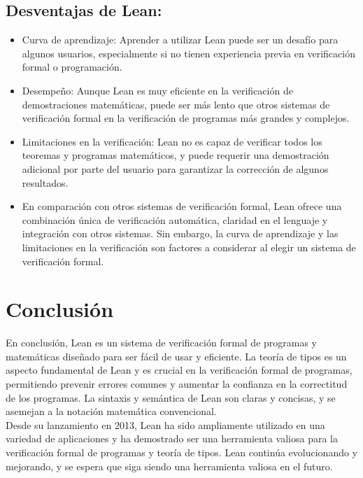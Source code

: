 \documentclass{article}
\begin{document}
\subsection{Desventajas de Lean:}
\begin{itemize}
	\item Curva de aprendizaje: Aprender a utilizar Lean puede ser un
	      desafío para algunos usuarios, especialmente si no tienen experiencia
	      previa en verificación formal o programación.

	\item Desempeño: Aunque Lean es muy eficiente en la verificación de
	      demostraciones matemáticas, puede ser más lento que otros sistemas de
	      verificación formal en la verificación de programas más grandes y
	      complejos.

	\item Limitaciones en la verificación: Lean no es capaz de verificar
	      todos los teoremas y programas matemáticos, y puede requerir una
	      demostración adicional por parte del usuario para garantizar la
	      corrección de algunos resultados.

	\item En comparación con otros sistemas de verificación formal, Lean
	      ofrece una combinación única de verificación automática, claridad en
	      el lenguaje y integración con otros sistemas. Sin embargo, la curva de
	      aprendizaje y las limitaciones en la verificación son factores a
	      considerar al elegir un sistema de verificación formal.

\end{itemize}
\section{Conclusión}
En conclusión, Lean es un sistema de verificación formal de programas y
matemáticas diseñado para ser fácil de usar y eficiente. La teoría de
tipos es un aspecto fundamental de Lean y es crucial en la verificación
formal de programas, permitiendo prevenir errores comunes y aumentar la
confianza en la correctitud de los programas. La sintaxis y semántica de
Lean son claras y concisas, y se asemejan a la notación matemática
convencional.\\

Desde su lanzamiento en 2013, Lean ha sido ampliamente utilizado en una
variedad de aplicaciones y ha demostrado ser una herramienta valiosa para
la verificación formal de programas y teoría de tipos. Lean continúa
evolucionando y mejorando, y se espera que siga siendo una herramienta
valiosa en el futuro.\\
\end{document}
